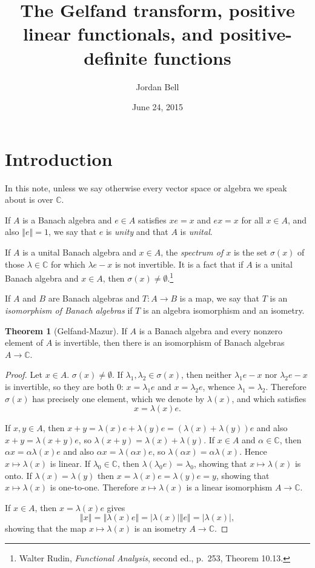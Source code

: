 \documentclass{article}
\newcommand{\norm}[1]{\left\Vert #1 \right\Vert}
\theoremstyle{definition}
\newtheorem{theorem}{Theorem}
\theoremstyle{definition}
\begin{document}
\title{The Gelfand transform,  positive linear functionals, and positive-definite functions}
\author{Jordan Bell}
\date{June 24, 2015}

\maketitle

\section{Introduction}
In this note, unless we say otherwise every vector space or algebra we speak about is over $\mathbb{C}$.

If $A$ is a Banach algebra and $e \in A$ satisfies $xe=x$ and $ex=x$ for all $x \in A$, and also $\norm{e}=1$, we say that $e$ is {\em unity} and  that
$A$ is {\em unital}.

If $A$ is a unital Banach algebra  and $x \in A$, the {\em spectrum of $x$} is the set $\sigma(x)$ of those $\lambda \in \mathbb{C}$
for which $\lambda e-x$ is not invertible. It is a fact that if $A$ is a unital Banach algebra and $x \in A$, then $\sigma(x) \neq \emptyset$.\footnote{Walter
Rudin, {\em Functional Analysis}, second ed., p.~253, Theorem 10.13.}


If $A$ and $B$ are Banach algebras and
$T:A \to B$ is a map, we say that $T$ is an {\em isomorphism of Banach algebras} if $T$ is an algebra isomorphism and an isometry.



\begin{theorem}[Gelfand-Mazur]
If $A$ is a Banach algebra and every nonzero element of $A$   is invertible, then there is an isomorphism of Banach algebras $A \to \mathbb{C}$.
\end{theorem}
\begin{proof}
Let $x \in A$. $\sigma(x) \neq \emptyset$.
If $\lambda_1,\lambda_2 \in \sigma(x)$, then neither
$\lambda_1 e -x$ nor $\lambda_2 e -x$ is  invertible, so they are both $0$: $x = \lambda_1 e$ and $x = \lambda_2 e$, whence
$\lambda_1 = \lambda_2$. Therefore $\sigma(x)$ has precisely one element, which we denote by $\lambda(x)$, and which satisfies
\[
x= \lambda(x) e.
\]

If $x,y \in A$, then
$x+y=\lambda(x)e+\lambda(y)e = (\lambda(x)+\lambda(y))e$
and also $x+y = \lambda(x+y)e$, so
$\lambda(x+y)=\lambda(x)+\lambda(y)$. If $x \in A$ and $\alpha \in \mathbb{C}$, then
$\alpha x = \alpha \lambda(x)e$ and also $\alpha x = \lambda(\alpha x)e$, so $\lambda(\alpha x)=\alpha \lambda(x)$. Hence
$x \mapsto \lambda(x)$ is linear. If $\lambda_0 \in \mathbb{C}$, then $\lambda(\lambda_0 e)=\lambda_0$, showing that $x \mapsto \lambda(x)$
is  onto. If $\lambda(x)=\lambda(y)$ then $x=\lambda(x)e = \lambda(y)e = y$, showing that $x \mapsto \lambda(x)$ is one-to-one. Therefore
$x \mapsto \lambda(x)$ is a linear isomorphism $A \to \mathbb{C}$.

If $x \in A$, then $x = \lambda(x)e$ gives
\[
\norm{x} = \norm{\lambda(x) e} = |\lambda(x)| \norm{e} = |\lambda(x)|,
\]
showing that the map $x \mapsto \lambda(x)$ is an isometry $A \to \mathbb{C}$.
\end{proof}
\end{document}
